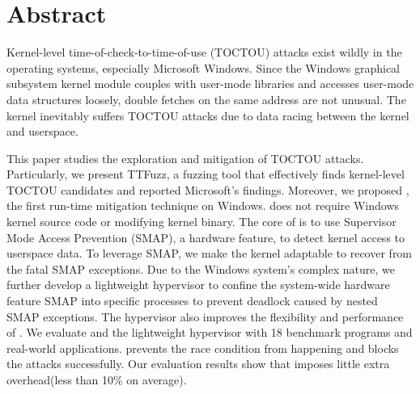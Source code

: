 \section{Abstract}





Kernel-level time-of-check-to-time-of-use (TOCTOU) attacks exist wildly in the operating systems, especially Microsoft Windows. Since the Windows graphical subsystem kernel module couples with user-mode libraries and accesses user-mode data structures loosely, double fetches on the same address are not unusual. The kernel inevitably suffers TOCTOU attacks due to data racing between the kernel and userspace. 

This paper studies the exploration and mitigation of TOCTOU attacks. Particularly, we present TTFuzz, a fuzzing tool that effectively finds kernel-level TOCTOU candidates and reported Microsoft's findings. Moreover, we proposed \name, the first run-time mitigation technique on Windows. \name does not require Windows kernel source code or modifying kernel binary. The core of \name is to use Supervisor Mode Access Prevention (SMAP), a hardware feature, to detect kernel access to userspace data. To leverage SMAP, we make the kernel adaptable to recover from the fatal SMAP exceptions. Due to the Windows system's complex nature, we further develop a lightweight hypervisor to confine the system-wide hardware feature SMAP into specific processes to prevent deadlock caused by nested SMAP exceptions. The hypervisor also improves the flexibility and performance of \name. We evaluate \name and the lightweight hypervisor with 18 benchmark programs and real-world applications. \name prevents the race condition from happening and blocks the attacks successfully. Our evaluation results show that \name imposes little extra overhead(less than 10\% on average).
